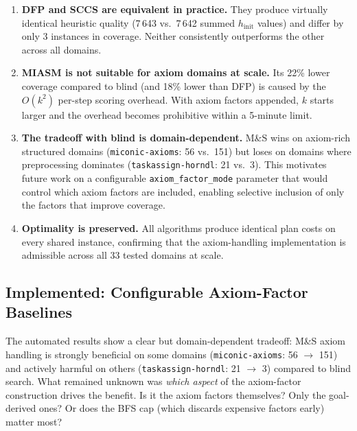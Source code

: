\documentclass[11pt,a4paper]{article}
\begin{document}
\begin{enumerate}
  \item \textbf{DFP and SCCS are equivalent in practice.}
    They produce virtually identical heuristic quality (7\,643 vs.\ 7\,642
    summed $h_{\mathrm{init}}$ values) and differ by only 3 instances in
    coverage.  Neither consistently outperforms the other across all domains.

  \item \textbf{MIASM is not suitable for axiom domains at scale.}
    Its 22\% lower coverage compared to blind (and 18\% lower than DFP) is
    caused by the $O(k^2)$ per-step scoring overhead.  With axiom factors
    appended, $k$ starts larger and the overhead becomes prohibitive within
    a 5-minute limit.

  \item \textbf{The tradeoff with blind is domain-dependent.}
    M\&S wins on axiom-rich structured domains (\texttt{miconic-axioms}:
    56 vs.\ 151) but loses on domains where preprocessing dominates
    (\texttt{taskassign-horndl}: 21 vs.\ 3).  This motivates future work on a
    configurable \texttt{axiom\_factor\_mode} parameter that would control
    which axiom factors are included, enabling selective inclusion of only
    the factors that improve coverage.

  \item \textbf{Optimality is preserved.}
    All algorithms produce identical plan costs on every shared instance,
    confirming that the axiom-handling implementation is admissible across
    all 33 tested domains at scale.
\end{enumerate}

\subsection{Implemented: Configurable Axiom-Factor Baselines}
\label{sec:next-steps-baselines}

The automated results show a clear but domain-dependent tradeoff: M\&S
axiom handling is strongly beneficial on some domains
(\texttt{miconic-axioms}: 56 $\to$ 151) and actively harmful on others
(\texttt{taskassign-horndl}: 21 $\to$ 3) compared to blind search.
What remained unknown was \emph{which aspect} of the axiom-factor construction
drives the benefit.  Is it the axiom factors themselves?  Only the goal-derived
ones?  Or does the BFS cap (which discards expensive factors early) matter most?
\end{document}
